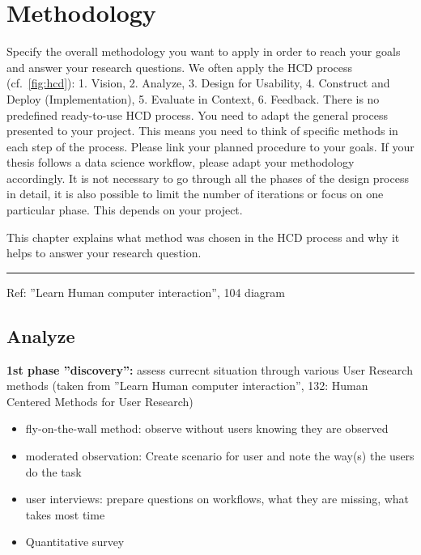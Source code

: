 \section{Methodology}
\label{subsec:methodology}
Specify the overall methodology you want to apply in order to reach your goals and answer your research questions. We often apply the HCD process (cf.~\autoref{fig:hcd}): 1. Vision, 2. Analyze, 3. Design for Usability, 4. Construct and Deploy (Implementation), 5. Evaluate in Context, 6. Feedback. There is no predefined ready-to-use HCD process. You need to adapt the general process presented to your project. This means you need to think of specific methods in each step of the process. Please link your planned procedure to your goals. If your thesis follows a data science workflow, please adapt your methodology accordingly. It is not necessary to go through all the phases of the design process in detail, it is also possible to limit the number of iterations or focus on one particular phase. This depends on your project.

This chapter explains what method was chosen in the HCD process and why it helps to answer your research question.
\\
\hrule

Ref: ''Learn Human computer interaction'', 104 diagram

\subsection{Analyze}
\label{subsec:analyze}

\textbf{1st phase ''discovery'':} assess currecnt situation through various User Research methods (taken from ''Learn Human computer interaction'', 132: Human Centered Methods for User Research)

\begin{itemize}
  \setlength\itemsep{-0.2em}
  \item fly-on-the-wall method: observe without users knowing they are observed
  \item moderated observation: Create scenario for user and note the way(s) the users do the task
  \item user interviews: prepare questions on workflows, what they are missing, what takes most time
  \item Quantitative survey
\end{itemize}


